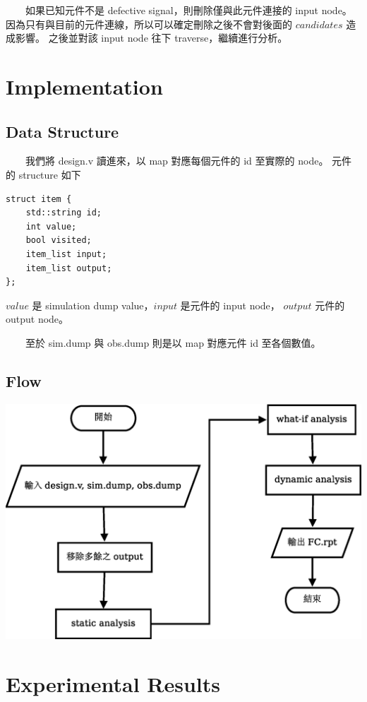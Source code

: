 \documentclass[12pt,a4paper]{article}
\begin{document}
　　如果已知元件不是 defective signal，則刪除僅與此元件連接的 input node。%
因為只有與目前的元件連線，所以可以確定刪除之後不會對後面的 $candidates$ 造成影響。
之後並對該 input node 往下 traverse，繼續進行分析。

\section{Implementation}

\subsection{Data Structure}

　　我們將 design.v 讀進來，以 map 對應每個元件的 id 至實際的 node。%
元件的 structure 如下

\begin{verbatim}
struct item {
    std::string id;
    int value;
    bool visited;
    item_list input;
    item_list output;
};
\end{verbatim}

$value$ 是 simulation dump value，$input$ 是元件的 input node，%
$output$ 元件的 output node。

　　至於 sim.dump 與 obs.dump 則是以 map 對應元件 id 至各個數值。

\subsection{Flow}

\begin{center}
\includegraphics[scale=0.6]{imgs/03.eps}
\end{center}

\section{Experimental Results}
\end{document}
